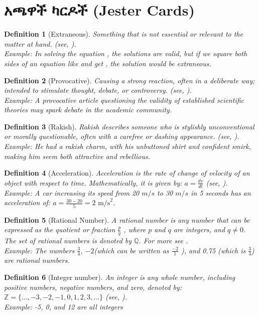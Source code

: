 \documentclass[a4paper,12pt]{article}
\newenvironment{geez}{\geezfont}{}
\theoremstyle{mystyle}
\newtheorem{definition}{Definition}
\numberwithin{equation}{section}
\numberwithin{theorem}{section}
\numberwithin{proposition}{section}
\numberwithin{example}{section}
\numberwithin{remark}{section}
\numberwithin{lemma}{section}
\numberwithin{corollary}{section}
\numberwithin{definition}{section}
\numberwithin{amharicdefinition}{section}
\begin{document}
\section{\begin{geez}አጫዋች ካርዶች (Jester Cards)\end{geez}}
\label{S:2}
\begin{definition}[Extraneous]Something that is not essential or relevant to the matter at hand. (see, \cite{dictionary2002merriam}).\\
Example: In solving the equation , the solutions are valid, but if we square both sides of an equation like and get , the solution would be extraneous.
\end{definition}
\begin{definition}[Provocative]Causing a strong reaction, often in a deliberate way; intended to stimulate thought, debate, or controversy.  (see,  \cite{dictionary1989oxford}).\\
Example: A provocative article questioning the validity of established scientific theories may spark debate in the academic community.
\end{definition}
\begin{definition}[Rakish] Rakish describes someone who is stylishly unconventional or morally questionable, often with a carefree or dashing appearance. (see, \cite{dictionary2002merriam}).\\
Example: He had a rakish charm, with his unbuttoned shirt and confident smirk, making him seem both attractive and rebellious.
\end{definition}
\begin{definition}[Acceleration] Acceleration is the rate of change of velocity of an object with respect to time. Mathematically, it is given by:
$a = \frac{dv}{dt}$  (see, \cite{serway2018current}).\\
Example: A car increasing its speed from 20 $m/s$ to 30 $m/s$ in 5 seconds has an acceleration of: $a = \frac{30 - 20}{5} = 2 \text{ m/s}^2$.
\end{definition}
\begin{definition}[Rational Number] A rational number is any number that can be expressed as the quotient or fraction $\frac{p}{q}$ , where $p$ and $q$ are integers, and $q\ne 0$. The set of rational numbers is denoted by $\mathbb{Q}$. For more see \cite{stewart2012calculus}.\\
Example: The numbers $\frac{3}{4}$, $-2$(which can be written as $\frac{-2}{1}$ ), and 0.75 (which is  $\frac{3}{4}$) are rational numbers.
\end{definition}
\begin{definition}[Integer number] An integer is any whole number, including positive numbers, negative numbers, and zero, denoted by:
$\mathbb{Z} = \{ \dots, -3, -2, -1, 0, 1, 2, 3, \dots \}$  (see, \cite{stewart2012calculus}).\\
Example: -5, 0, and 12 are all integers
\end{definition}
\end{document}
